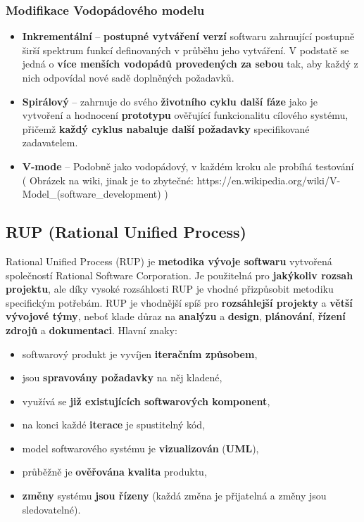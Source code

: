 \subsubsection{Modifikace Vodopádového modelu}
\begin{itemize}
\item \textbf{Inkrementální} -- \textbf{postupné vytváření verzí} softwaru zahrnující postupně širší spektrum funkcí definovaných v průběhu jeho vytváření. V podstatě se jedná o \textbf{více menších vodopádů provedených za sebou} tak, aby každý z nich odpovídal nové sadě doplněných požadavků.
\item \textbf{Spirálový} -- zahrnuje do svého \textbf{životního cyklu další fáze} jako je vytvoření a hodnocení \textbf{prototypu} ověřující funkcionalitu cílového systému, přičemž \textbf{každý cyklus nabaluje další požadavky} specifikované zadavatelem.
\item \textbf{V-mode} -- Podobně jako vodopádový, v každém kroku ale probíhá testování ( Obrázek na wiki, jinak je to zbytečné: https://en.wikipedia.org/wiki/V-Model_(software_development) )
\end{itemize}


\subsection{RUP (Rational Unified Process)}
Rational Unified Process (RUP) je \textbf{metodika vývoje softwaru} vytvořená společností Rational Software Corporation. Je použitelná pro \textbf{jakýkoliv rozsah projektu}, ale díky vysoké rozsáhlosti RUP je vhodné přizpůsobit metodiku specifickým potřebám. RUP je vhodnější spíš pro \textbf{rozsáhlejší projekty} a \textbf{větší vývojové týmy}, neboť klade důraz na \textbf{analýzu} a \textbf{design}, \textbf{plánování}, \textbf{řízení zdrojů} a \textbf{dokumentaci}. Hlavní znaky:

\begin{itemize}
\item softwarový produkt je vyvíjen \textbf{iteračním způsobem},
\item jsou \textbf{spravovány požadavky} na něj kladené,
\item využívá se \textbf{již existujících softwarových komponent},
\item na konci každé \textbf{iterace} je spustitelný kód,
\item model softwarového systému je \textbf{vizualizován} (\textbf{UML}),
\item průběžně je \textbf{ověřována} \textbf{kvalita} produktu,
\item \textbf{změny} systému\textbf{ jsou řízeny} (každá změna je přijatelná a změny jsou sledovatelné).
\end{itemize}

